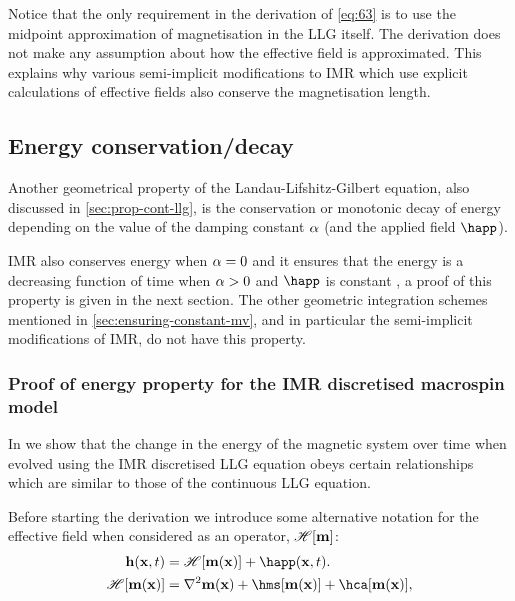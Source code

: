 Notice that the only requirement in the derivation of \cref{eq:63} is to use the midpoint approximation of magnetisation in the LLG itself.
The derivation does not make any assumption about how the effective field is approximated.
This explains why various semi-implicit modifications to IMR which use explicit calculations of effective fields also conserve the magnetisation length.


\subsection{Energy conservation/decay}
\label{sec:energy-cons}

Another geometrical property of the Landau-Lifshitz-Gilbert equation, also discussed in \cref{sec:prop-cont-llg}, is the conservation or monotonic decay of energy depending on the value of the damping constant $\alpha$ (and the applied field $\happ$).

IMR also conserves energy when $\alpha = 0$ and it ensures that the energy is a decreasing function of time when $\alpha > 0$ and $\happ$ is constant \cite{DAquino2005}, a proof of this property is given in the next section.
The other geometric integration schemes mentioned in \cref{sec:ensuring-constant-mv}, and in particular the semi-implicit modifications of IMR, do not have this property.


\subsubsection{Proof of energy property for the IMR discretised macrospin model}
\label{sec:proof-energy-prop}

\newcommand{\happerror}{\mathcal{E}_\text{ap}}

In  we show that the change in the energy of the magnetic system over time when evolved using the IMR discretised LLG equation obeys certain relationships which are similar to those of the continuous LLG equation.

Before starting the derivation we introduce some alternative notation for the effective field when considered as an operator, $\mathscr{H} {\left[ \boldsymbol{\mathrm{m}} \right]}$:
\begin{equation}
  \begin{aligned}
    \label{eq:hop}
    \hv(\xv, t) &= \hopb{\mv(\xv)} + \happ(\xv, t). \\
    \hopb{\mv(\xv)} &= \lap \mv(\xv) + \hms[\mv(\xv)] + \hca[\mv(\xv)], \\
  \end{aligned}
\end{equation}

